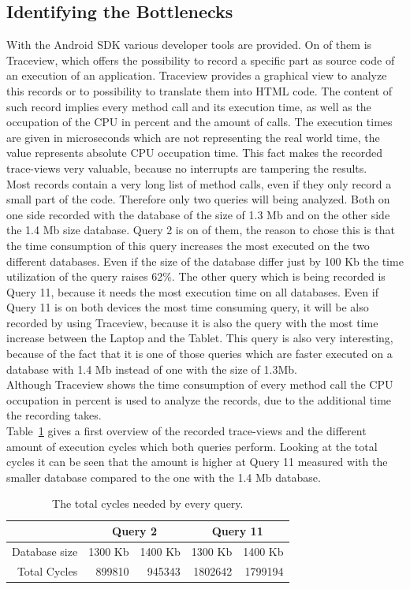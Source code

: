 \subsection{Identifying the Bottlenecks}
\label{sec:identifying-the-bottlenecks}
With the Android SDK various developer tools are provided.
On of them is Traceview, which offers the possibility to record a specific part as source code of an execution of an application.
Traceview provides a graphical view to analyze this records or to possibility to translate them into HTML code.
The content of such record implies every method call and its execution time, as well as the occupation of the CPU in percent and the amount of calls.
The execution times are given in microseconds which are not representing the real world time, the value represents absolute CPU occupation time.
This fact makes the recorded trace-views very valuable, because no interrupts are tampering the results.\\
Most records contain a very long list of method calls, even if they only record a small part of the code.
Therefore only two queries will being analyzed.
Both on one side recorded with the database of the size of 1.3 Mb and on the other side the 1.4 Mb size database.
Query 2 is on of them, the reason to chose this is that the time consumption of this query increases the most executed on the two different databases.
Even if the size of the database differ just by 100 Kb the time utilization of the query raises 62\%.
The other query which is being recorded is Query 11, because it needs the most execution time on all databases.
Even if Query 11 is on both devices the most time consuming query, it will be also recorded by using Traceview, because it is also the query with the most time increase between the Laptop and the Tablet.
This query is also very interesting, because of the fact that it is one of those queries which are faster executed on a database with 1.4 Mb instead of one with the size of 1.3Mb.
\\
Although Traceview shows the time consumption of every method call the CPU occupation in percent is used to analyze the records, due to the additional time the recording takes.
\\
Table~\ref{tab:traceview-cycles} gives a first overview of the recorded trace-views and the different amount of execution cycles which both queries perform.
Looking at the total cycles it can be seen that the amount is higher at Query 11 measured with the smaller database compared to the one with the 1.4 Mb database.
\begin {table}[htpb] 
  \centering
\begin {tabular} {|r|r|r|r|r|}
  	\hline
	&\multicolumn{2}{c}{Query 2}&\multicolumn{2}{|c|}{Query 11}\\
	\hline
	Database size&1300 Kb&1400 Kb&1300 Kb&1400 Kb\\
	\hline
	Total Cycles&899810&945343&1802642&1799194\\
	\hline
\end {tabular}
\caption {The total cycles needed by every query.}
\label {tab:traceview-cycles}
\end {table}
